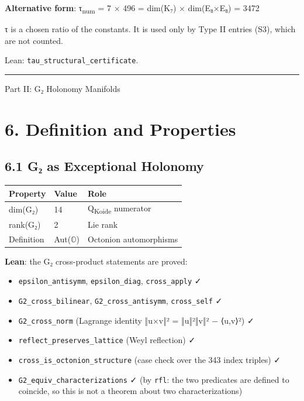 \documentclass[11pt,a4paper]{article}
\begin{document}
\textbf{Alternative form}: τ\textsubscript{num} = 7 × 496 = dim(K₇) × dim(E₈×E₈) = 3472

τ is a chosen ratio of the constants. It is used only by Type II entries (S3), which are not counted.

Lean: \texttt{tau\_\allowbreak{}structural\_\allowbreak{}certificate}.

\begin{center}\rule{\linewidth}{0.5pt}\end{center}

Part II: G₂ Holonomy Manifolds

\section{6. Definition and Properties}\label{definition-and-properties}

\subsection{6.1 G₂ as Exceptional Holonomy}\label{gux2082-as-exceptional-holonomy}

\begin{longtable}[]{@{}lll@{}}
\toprule\noalign{}
Property & Value & Role \\
\midrule\noalign{}
\endhead
\bottomrule\noalign{}
\endlastfoot
dim(G₂) & 14 & Q\textsubscript{Koide} numerator \\
rank(G₂) & 2 & Lie rank \\
Definition & Aut(\ensuremath{\mathbb{O}}) & Octonion automorphisms \\
\end{longtable}

\textbf{Lean}: the G₂ cross-product statements are proved:

\begin{itemize}
\tightlist
\item
  \texttt{epsilon\_\allowbreak{}antisymm}, \texttt{epsilon\_\allowbreak{}diag}, \texttt{cross\_\allowbreak{}apply} ✓
\item
  \texttt{G2\_\allowbreak{}cross\_\allowbreak{}bilinear}, \texttt{G2\_\allowbreak{}cross\_\allowbreak{}antisymm}, \texttt{cross\_\allowbreak{}self} ✓
\item
  \texttt{G2\_\allowbreak{}cross\_\allowbreak{}norm} (Lagrange identity ‖u×v‖² = ‖u‖²‖v‖² − ⟨u,v⟩²) ✓
\item
  \texttt{reflect\_\allowbreak{}preserves\_\allowbreak{}lattice} (Weyl reflection) ✓
\item
  \texttt{cross\_\allowbreak{}is\_\allowbreak{}octonion\_\allowbreak{}structure} (case check over the 343 index triples) ✓
\item
  \texttt{G2\_\allowbreak{}equiv\_\allowbreak{}characterizations} ✓ (by \texttt{rfl}: the two predicates are defined to coincide, so this is not a theorem about two characterizations)
\end{itemize}
\end{document}
